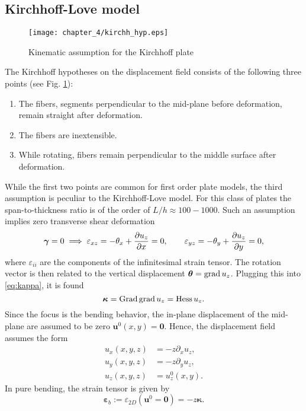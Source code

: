 \subsection{Kirchhoff-Love model}
\begin{figure}[tb]
	\centering
	\texttt{[image: chapter\_4/kirchh\_hyp.eps]}
	\caption{Kinematic assumption for the Kirchhoff plate}
	\label{fig:kirchh_hyp}
\end{figure}

The Kirchhoff hypotheses on the displacement field consists of the following three points (see Fig. \ref{fig:kirchh_hyp}):
\begin{enumerate}
\item The fibers, segments perpendicular to the mid-plane before deformation, remain straight after deformation.
\item The fibers are inextensible.
\item While rotating, fibers remain perpendicular to the
middle surface after deformation.
\end{enumerate}
While the first two points are common for first order plate models, the third assumption is  peculiar to the Kirchhoff-Love model. For this class of plates the span-to-thickness ratio is of the order of $L/h \approx 100 - 1000$. Such an assumption implies zero transverse shear deformation
\[
\bm{\gamma}=0 \implies \varepsilon_{xz}=-\theta_x + \diffp{u_z}{x} = 0, \qquad \varepsilon_{yz}=-\theta_y + \diffp{u_z}{y} = 0,
\]
where $\varepsilon_{ii}$ are the components of the infinitesimal strain tensor. The rotation vector is then related to the vertical displacement $\bm{\theta} = \operatorname*{grad} u_z$. Plugging this into \eqref{eq:kappa}, it is found
\begin{equation}
	\bm{\kappa} = \operatorname*{Grad} \operatorname*{grad} u_z = \operatorname*{Hess} u_z.
\end{equation}
Since the focus is the bending behavior, the in-plane displacement of the mid-plane are assumed to be zero $\bm{u}^0(x,y)=\bm{0}$. Hence, the displacement field assumes the form
\begin{equation}
\begin{aligned}
u_x(x,y,z) &= -z \partial_x {u_z}, \\
u_y(x,y,z) &= -z \partial_y {u_z}, \\
u_z(x,y,z) &= u_z^0(x,y).
\end{aligned}
\end{equation}
In pure bending, the strain tensor is given by
\[
\bm{\varepsilon}_b := \varepsilon_{2D}(\bm{u}^0=\bm{0}) = -z \bm{\kappa}.
\]
